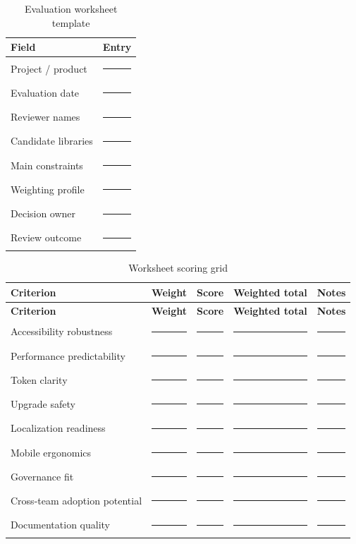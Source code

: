 \begin{table}[htbp]
  \centering
  \caption{Evaluation worksheet template}
  \begin{tabularx}{\textwidth}{@{}p{}Y@{}}
    \toprule
    \textbf{Field} & \textbf{Entry} \\
    \midrule
    Project / product & \rule{10cm}{0.4pt} \\
    Evaluation date & \rule{10cm}{0.4pt} \\
    Reviewer names & \rule{10cm}{0.4pt} \\
    Candidate libraries & \rule{10cm}{0.4pt} \\
    Main constraints & \rule{10cm}{0.4pt} \\
    Weighting profile & \rule{10cm}{0.4pt} \\
    Decision owner & \rule{10cm}{0.4pt} \\
    Review outcome & \rule{10cm}{0.4pt} \\
    \bottomrule
  \end{tabularx}
\end{table}

\begin{longtable}{@{}p{}p{}p{}p{}p{}@{}}
\caption{Worksheet scoring grid}\label{tab:appendix-a-worksheet}\\
\toprule
\textbf{Criterion} & \textbf{Weight} & \textbf{Score} & \textbf{Weighted total} & \textbf{Notes} \\
\midrule
\endfirsthead
\toprule
\textbf{Criterion} & \textbf{Weight} & \textbf{Score} & \textbf{Weighted total} & \textbf{Notes} \\
\midrule
\endhead
\bottomrule
\endfoot
Accessibility robustness & \rule{1.2cm}{0.4pt} & \rule{1.0cm}{0.4pt} & \rule{1.4cm}{0.4pt} & \rule{5.0cm}{0.4pt} \\
Performance predictability & \rule{1.2cm}{0.4pt} & \rule{1.0cm}{0.4pt} & \rule{1.4cm}{0.4pt} & \rule{5.0cm}{0.4pt} \\
Token clarity & \rule{1.2cm}{0.4pt} & \rule{1.0cm}{0.4pt} & \rule{1.4cm}{0.4pt} & \rule{5.0cm}{0.4pt} \\
Upgrade safety & \rule{1.2cm}{0.4pt} & \rule{1.0cm}{0.4pt} & \rule{1.4cm}{0.4pt} & \rule{5.0cm}{0.4pt} \\
Localization readiness & \rule{1.2cm}{0.4pt} & \rule{1.0cm}{0.4pt} & \rule{1.4cm}{0.4pt} & \rule{5.0cm}{0.4pt} \\
Mobile ergonomics & \rule{1.2cm}{0.4pt} & \rule{1.0cm}{0.4pt} & \rule{1.4cm}{0.4pt} & \rule{5.0cm}{0.4pt} \\
Governance fit & \rule{1.2cm}{0.4pt} & \rule{1.0cm}{0.4pt} & \rule{1.4cm}{0.4pt} & \rule{5.0cm}{0.4pt} \\
Cross-team adoption potential & \rule{1.2cm}{0.4pt} & \rule{1.0cm}{0.4pt} & \rule{1.4cm}{0.4pt} & \rule{5.0cm}{0.4pt} \\
Documentation quality & \rule{1.2cm}{0.4pt} & \rule{1.0cm}{0.4pt} & \rule{1.4cm}{0.4pt} & \rule{5.0cm}{0.4pt} \\
\end{longtable}


